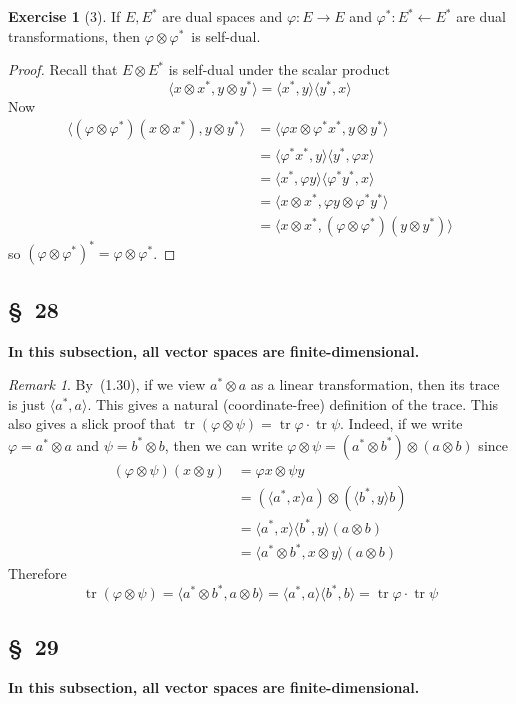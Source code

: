 \documentclass[letterpaper,12pt]{article}
\newcommand{\from}{\leftarrow}
\DeclareMathOperator{\tr}{tr}
\newcommand{\mult}{\cdot}
\newcommand{\tprod}{\otimes}
\newcommand{\sprod}[2]{\langle#1,#2\rangle}
\theoremstyle{definition}
\newtheorem*{exer}{Exercise}
\theoremstyle{remark}
\newtheorem*{rmk}{Remark}
\begin{document}
\begin{exer}[3]
If \(E,E^*\) are dual spaces and \(\varphi:E\to E\) and \(\varphi^*:E^*\from E^*\) are dual transformations, then \(\varphi\tprod\varphi^*\)~is self-dual.
\end{exer}
\begin{proof}
Recall that \(E\tprod E^*\) is self-dual under the scalar product
\[\sprod{x\tprod x^*}{y\tprod y^*}=\sprod{x^*}{y}\sprod{y^*}{x}\]
Now
\begin{align*}
\sprod{(\varphi\tprod\varphi^*)(x\tprod x^*)}{y\tprod y^*}&=\sprod{\varphi x\tprod\varphi^* x^*}{y\tprod y^*}\\
	&=\sprod{\varphi^* x^*}{y}\sprod{y^*}{\varphi x}\\
	&=\sprod{x^*}{\varphi y}\sprod{\varphi^* y^*}{x}\\
	&=\sprod{x\tprod x^*}{\varphi y\tprod\varphi^* y^*}\\
	&=\sprod{x\tprod x^*}{(\varphi\tprod\varphi^*)(y\tprod y^*)}
\end{align*}
so \((\varphi\tprod\varphi^*)^*=\varphi\tprod\varphi^*\).
\end{proof}

\subsection*{\S~28}
\textbf{In this subsection, all vector spaces are finite-dimensional.}

\begin{rmk}
By~(1.30), if we view \(a^*\tprod a\) as a linear transformation, then its trace is just \(\sprod{a^*}{a}\). This gives a natural (coordinate-free) definition of the trace. This also gives a slick proof that \(\tr(\varphi\tprod\psi)=\tr\varphi\mult\tr\psi\). Indeed, if we write \(\varphi=a^*\tprod a\) and \(\psi=b^*\tprod b\), then we can write \(\varphi\tprod\psi=(a^*\tprod b^*)\tprod(a\tprod b)\) since
\begin{align*}
(\varphi\tprod\psi)(x\tprod y)&=\varphi x\tprod\psi y\\
	&=(\sprod{a^*}{x}a)\tprod(\sprod{b^*}{y}b)\\
	&=\sprod{a^*}{x}\sprod{b^*}{y}(a\tprod b)\\
	&=\sprod{a^*\tprod b^*}{x\tprod y}(a\tprod b)
\end{align*}
Therefore
\[\tr(\varphi\tprod\psi)=\sprod{a^*\tprod b^*}{a\tprod b}=\sprod{a^*}{a}\sprod{b^*}{b}=\tr\varphi\mult\tr\psi\]
\end{rmk}

\subsection*{\S~29}
\textbf{In this subsection, all vector spaces are finite-dimensional.}
\end{document}
